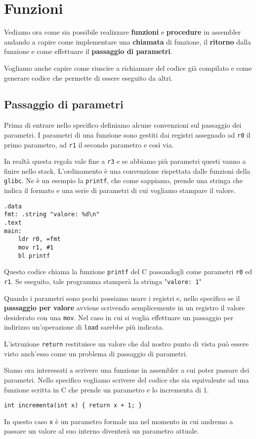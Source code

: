 \section{Funzioni}
Vediamo ora come sia possibile realizzare \textbf{funzioni} e \textbf{procedure} in assembler
andando a capire come implementare una \textbf{chiamata} di funzione, il \textbf{ritorno} dalla
funzione e come effettuare il \textbf{passaggio di parametri}.

Vogliamo anche capire come riuscire a richiamare del codice già compilato e come generare codice
che permette di essere eseguito da altri.

\subsection{Passaggio di parametri}
Prima di entrare nello specifico definiamo alcune convenzioni sul passaggio dei parametri. I
parametri di una funzione sono gestiti dai registri assegnado ad \verb|r0| il primo parametro,
ad \verb|r1| il secondo parametro e così via.

In realtà questa regola vale fine a \verb|r3| e se abbiamo più parametri questi vanno a finire
nello stack. L'ordinamento è una convenzione rispettata dalle funzioni della \verb|glibc|. Ne è un
esempio la \verb|printf|, che come sappiamo, prende una stringa che indica il formato e una serie
di parametri di cui vogliamo stampare il valore.
\begin{verbatim}
.data
fmt: .string "valore: %d\n"
.text
main:
	ldr r0, =fmt
	mov r1, #1
	bl printf
\end{verbatim}
Questo codice chiama la funzione \verb|printf| del C passandogli come parametri \verb|r0| ed
\verb|r1|. Se eseguito, tale programma stamperà la stringa "\verb|valore: 1|"

Quando i parametri sono pochi possiamo usare i registri e, nello specifico se il
\textbf{passaggio per valore} avviene scrivendo semplicemente in un registro il valore desiderato
con una \verb|mov|. Nel caso in cui si voglia effettuare un passaggio per indirizzo un'operazione
di \verb|load| sarebbe più indicata.

L'istruzione \verb|return| restituisce un valore che dal nostro punto di vista può essere visto
anch'esso come un problema di passaggio di parametri.

Siamo ora interessati a scrivere una funzione in assembler a cui poter passare dei parametri. Nello
specifico vogliamo scrivere del codice che sia equivalente ad una funzione scritta in C che prende
un parametro e lo incrementa di 1.
\begin{verbatim}
int incrementa(int x) { return x + 1; }
\end{verbatim}
In questo caso \verb|x| è un parametro formale ma nel momento in cui andremo a passare un valore
al suo interno diventerà un parametro attuale.

